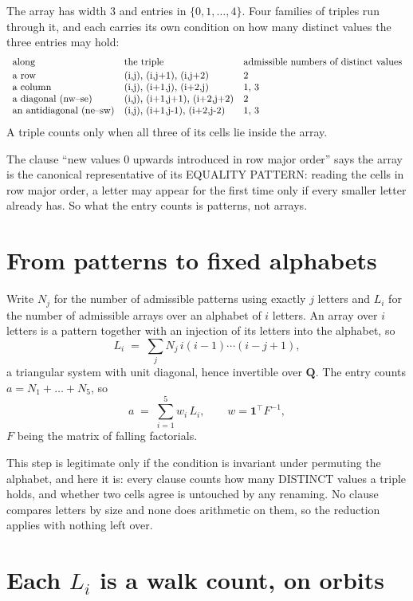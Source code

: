 \documentclass[11pt,a4paper]{article}
\theoremstyle{plain}
\theoremstyle{definition}
\begin{document}
The array has width $3$ and entries in $\{0,1,\dots,4\}$. Four families of triples
run through it, and each carries its own condition on how many distinct values the three
entries may hold:
\[
\begin{array}{lll}
\text{along} & \text{the triple} & \text{admissible numbers of distinct values} \\[2pt]
\text{a row} & $(i,j),\ (i,j+1),\ (i,j+2)$ & $2$ \\
\text{a column} & $(i,j),\ (i+1,j),\ (i+2,j)$ & $1, 3$ \\
\text{a diagonal (nw--se)} & $(i,j),\ (i+1,j+1),\ (i+2,j+2)$ & $2$ \\
\text{an antidiagonal (ne--sw)} & $(i,j),\ (i+1,j-1),\ (i+2,j-2)$ & $1, 3$ \\
\end{array}
\]
A triple counts only when all three of its cells lie inside the array.

The clause ``new values $0$ upwards introduced in row major order'' says the array is the
canonical representative of its EQUALITY PATTERN: reading the cells in row major order, a
letter may appear for the first time only if every smaller letter already has. So what the
entry counts is patterns, not arrays.

\section{From patterns to fixed alphabets}

Write $N_j$ for the number of admissible patterns using exactly $j$ letters and $L_i$ for the
number of admissible arrays over an alphabet of $i$ letters. An array over $i$ letters is a
pattern together with an injection of its letters into the alphabet, so
\[
L_i\;=\;\sum_j N_j\,i(i-1)\cdots(i-j+1),
\]
a triangular system with unit diagonal, hence invertible over $\mathbf{Q}$. The entry counts
$a=N_1+\dots+N_{5}$, so
\[
a\;=\;\sum_{i=1}^{5}w_i\,L_i ,\qquad w=\mathbf{1}^{\!\top}F^{-1},
\]
$F$ being the matrix of falling factorials.

This step is legitimate only if the condition is invariant under permuting the alphabet, and
here it is: every clause counts how many DISTINCT values a triple holds, and whether two cells
agree is untouched by any renaming. No clause compares letters by size and none does arithmetic
on them, so the reduction applies with nothing left over.

\section{Each $L_i$ is a walk count, on orbits}
\end{document}
